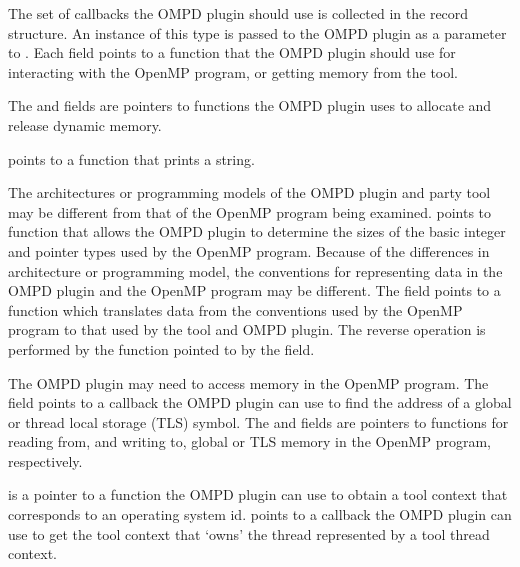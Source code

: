 \descr
The set of callbacks the OMPD plugin should use is collected
in the  record structure.
An instance of this type is passed to the OMPD plugin
as a parameter to .
Each field points to a function that the OMPD plugin should use
for interacting with the OpenMP program, or getting memory from
the tool.

The  and  fields are
pointers to functions the OMPD plugin uses to allocate and release
dynamic memory.

 points to a function that prints a string.

The architectures or programming models of the OMPD plugin and
party tool may be different from that of the OpenMP
program being examined.
 points to function that allows
the OMPD plugin to determine the sizes of the basic integer
and pointer types used by the OpenMP program.
Because of the differences in architecture or programming model,
the conventions for representing data in the OMPD plugin and
the OpenMP program may be different.
The  field points to a function which translates
data from the conventions used by the OpenMP program to that used
by the tool and OMPD plugin.
The reverse operation is performed by the function pointed
to by the  field.

The OMPD plugin may need to access memory in the OpenMP program.
The  field points to a callback the
OMPD plugin can use to find the address of a global or thread
local storage (TLS) symbol.
The  and  fields are
pointers to functions for reading from, and writing to, global or TLS
memory in the OpenMP program, respectively.

 is a pointer to a function
the OMPD plugin can use to obtain a tool context that corresponds to
an operating system id.
 points to a callback
the OMPD plugin can use to get the tool context that `owns' the
thread represented by a tool thread context.


